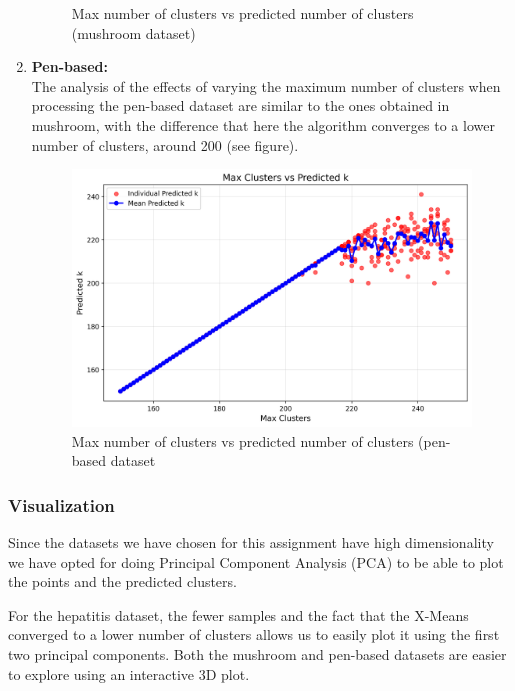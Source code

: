 \begin{enumerate}
\begin{figure}[H]
        \caption{Max number of clusters vs predicted number of clusters (mushroom dataset)}
    \end{figure}
    \item \textbf{Pen-based:}
    \\ The analysis of the effects of varying the maximum number of clusters when processing the pen-based dataset are similar to the ones obtained in mushroom, with the difference that here the algorithm converges to a lower number of clusters, around 200 (see figure).
    \begin{figure}[H]
        \centering
        \includegraphics[width=0.7\linewidth]{figures/XMeans/pen-based_max_k_vs_predicted_k.png}
        \caption{Max number of clusters vs predicted number of clusters (pen-based dataset}
    \end{figure}
\end{enumerate}

\subsubsection{Visualization}

Since the datasets we have chosen for this assignment have high dimensionality we have opted for doing Principal Component Analysis (PCA) to be able to plot the points and the predicted clusters. 

For the hepatitis dataset, the fewer samples and the fact that the X-Means converged to a lower number of clusters allows us to easily plot it using the first two principal components. Both the mushroom and pen-based datasets are easier to explore using an interactive 3D plot.

